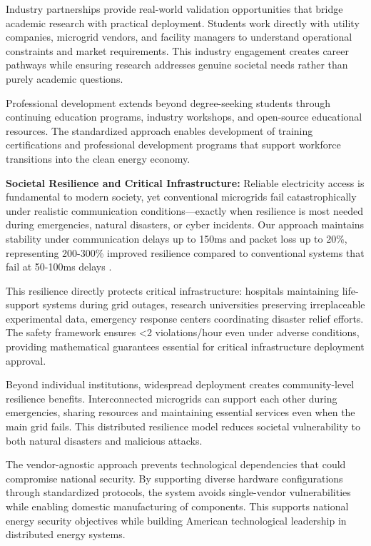 \documentclass[12pt]{article}
\begin{document}
Industry partnerships provide real-world validation opportunities that bridge academic research with practical deployment. Students work directly with utility companies, microgrid vendors, and facility managers to understand operational constraints and market requirements. This industry engagement creates career pathways while ensuring research addresses genuine societal needs rather than purely academic questions.

Professional development extends beyond degree-seeking students through continuing education programs, industry workshops, and open-source educational resources. The standardized approach enables development of training certifications and professional development programs that support workforce transitions into the clean energy economy.

\textbf{Societal Resilience and Critical Infrastructure:} Reliable electricity access is fundamental to modern society, yet conventional microgrids fail catastrophically under realistic communication conditions—exactly when resilience is most needed during emergencies, natural disasters, or cyber incidents. Our approach maintains stability under communication delays up to 150ms and packet loss up to 20\%, representing 200-300\% improved resilience compared to conventional systems that fail at 50-100ms delays \cite{baseline2023delay}.

This resilience directly protects critical infrastructure: hospitals maintaining life-support systems during grid outages, research universities preserving irreplaceable experimental data, emergency response centers coordinating disaster relief efforts. The safety framework ensures <2 violations/hour even under adverse conditions, providing mathematical guarantees essential for critical infrastructure deployment approval.

Beyond individual institutions, widespread deployment creates community-level resilience benefits. Interconnected microgrids can support each other during emergencies, sharing resources and maintaining essential services even when the main grid fails. This distributed resilience model reduces societal vulnerability to both natural disasters and malicious attacks.

The vendor-agnostic approach prevents technological dependencies that could compromise national security. By supporting diverse hardware configurations through standardized protocols, the system avoids single-vendor vulnerabilities while enabling domestic manufacturing of components. This supports national energy security objectives while building American technological leadership in distributed energy systems.
\end{document}
